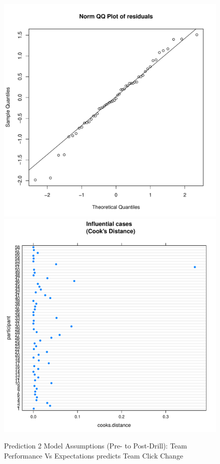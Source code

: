 \begin{CJK}{UTF8}{gbsn}
\begin{figure}[!htbp]
    \includegraphics[scale =.4]{images/TEM21QQNorm.pdf}
    \includegraphics[scale =.4]{images/TEM21CooksD.pdf}
    \caption{Prediction 2 Model Assumptions (Pre- to Post-Drill): Team Performance Vs Expectations predicts Team Click Change}
   \label{fig:M21Assumptions}
\end{figure}




\end{CJK}
